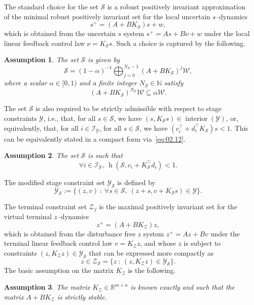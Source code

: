 \documentclass[twocolumn]{autart}
\newtheorem{assumption}{Assumption}
\newcommand{\mb}[1]{\mathbb{#1}}
\newcommand{\mc}[1]{\mathcal{#1}}
\newcommand{\N}{\mb{N}}
\newcommand{\R}{\mb{R}}
\newcommand{\Rnm}[2]{\R^{{#1}\times{#2}}}
\newcommand{\support}[2]{\operatorname{h}(#1,#2)}
\numberwithin{equation}{section}
\begin{document}
The standard choice for the set $\mc{S}$ is a robust positively invariant approximation~\cite{rakovic:kerrigan:kouramas:mayne:2004b} of the minimal robust positively invariant set for the local uncertain $s$--dynamics
\begin{equation}
\label{eq:02.09}
s^+=(A+BK_\mc{S})s+w,
\end{equation} 
which is obtained from the uncertain $s$ system $s^+=As+B\nu+w$ under the local linear feedback control law $\nu=K_\mc{S}s$. Such a choice is captured by the following.
\begin{assumption}
\label{ass:02.06}
 The set $\mc{S}$ is given by
 \begin{equation}
 \label{eq:02.10}
 \mc{S}= (1-\alpha)^{-1}\bigoplus_{j=0}^{N_\mc{S}-1} (A+BK_\mc{S})^j\mc{W},
 \end{equation}
 where a scalar $\alpha \in [0,1)$ and a finite integer $N_\mc{S}\in\N$ satisfy
 \begin{equation}
 \label{eq:02.11}
 (A+BK_\mc{S})^{N_\mc{S}}\mc{W}\subseteq \alpha \mc{W}.
 \end{equation} 
\end{assumption}
The set $\mc{S}$ is also required to be strictly admissible with respect to stage constraints $\mc{Y}$, i.e., that, for all $s\in\mc{S}$, we have $(s,K_\mc{S}s)\in \operatorname{interior}(\mc{Y})$, or, equivalently, that, for all $i\in \mc{I}_\mc{Y}$, for all $s\in \mc{S}$, we have $(c_i^\top +d_i^\top K_\mc{S})s<1$. This can be equivalently stated in a compact form via~\eqref{eq:02.12}.
\begin{assumption}
\label{ass:02.07}
 The set $\mc{S}$ is such that
 \begin{equation}
 \label{eq:02.12}
 \forall i\in \mc{I}_\mc{Y},\  \support{\mc{S}}{c_i+K_\mc{S}^\top d_i}<1.
 \end{equation} 
\end{assumption}

The modified stage constraint set $\mc{Y}_\mc{S}$ is defined by
\begin{equation}
\label{eq:02.13}
\mc{Y}_{\mc{S}}:=\{(z,v)\ :\ \forall s\in\mc{S},\  (z+s,v+K_\mc{S}s)\in\mc{Y}\}.
\end{equation}


The terminal constraint set $\mc{Z}_f$ is the maximal positively invariant set for the virtual terminal $z$--dynamics
\begin{equation}
\label{eq:02.14}
z^+ =(A+BK_\mc{Z})z,
\end{equation}
which is obtained from the disturbance free $z$ system $z^+=Az+Bv$ under the terminal linear feedback control law $v=K_\mc{Z}z$, and whose $z$ is subject to constraints
$(z,K_\mc{Z}z)\in\mc{Y}_\mc{S}$ that can be expressed more compactly  as
\begin{equation}
\label{eq:02.15}
z\in\mc{Z}_\mc{S}=\{z\ :\ (z,K_\mc{Z}z)\in\mc{Y}_\mc{S}\}.
\end{equation}
The basic assumption on the matrix $K_\mc{Z}$ is the following.
\begin{assumption} 
\label{ass:02.08}
 The matrix $K_\mc{Z}\in\Rnm{m}{n}$ is known exactly and such that the matrix $A+BK_\mc{Z}$ is strictly stable.
\end{assumption}
\end{document}
